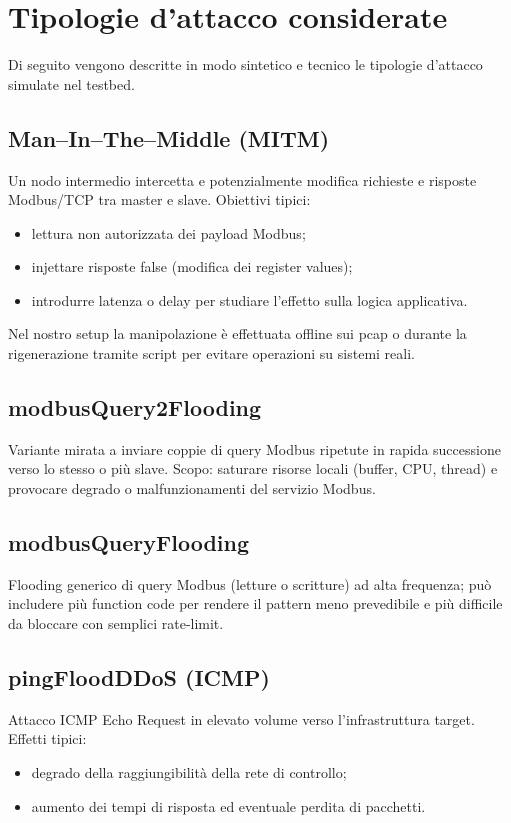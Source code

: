 \section{Tipologie d'attacco considerate}
Di seguito vengono descritte in modo sintetico e tecnico le tipologie d'attacco simulate nel testbed.

\subsection{Man--In--The--Middle (MITM)}
Un nodo intermedio intercetta e potenzialmente modifica richieste e risposte Modbus/TCP tra master e slave.  
Obiettivi tipici:
\begin{itemize}
  \item lettura non autorizzata dei payload Modbus;
  \item injettare risposte false (modifica dei register values);
  \item introdurre latenza o delay per studiare l'effetto sulla logica applicativa.
\end{itemize}
Nel nostro setup la manipolazione è effettuata offline sui pcap o durante la rigenerazione tramite script per evitare operazioni su sistemi reali.

\subsection{modbusQuery2Flooding}
Variante mirata a inviare coppie di query Modbus ripetute in rapida successione verso lo stesso o più slave.  
Scopo: saturare risorse locali (buffer, CPU, thread) e provocare degrado o malfunzionamenti del servizio Modbus.

\subsection{modbusQueryFlooding}
Flooding generico di query Modbus (letture o scritture) ad alta frequenza; può includere più function code per rendere il pattern meno prevedibile e più difficile da bloccare con semplici rate‑limit.

\subsection{pingFloodDDoS (ICMP)}
Attacco ICMP Echo Request in elevato volume verso l'infrastruttura target. Effetti tipici:
\begin{itemize}
  \item degrado della raggiungibilità della rete di controllo;
  \item aumento dei tempi di risposta ed eventuale perdita di pacchetti.
\end{itemize}

